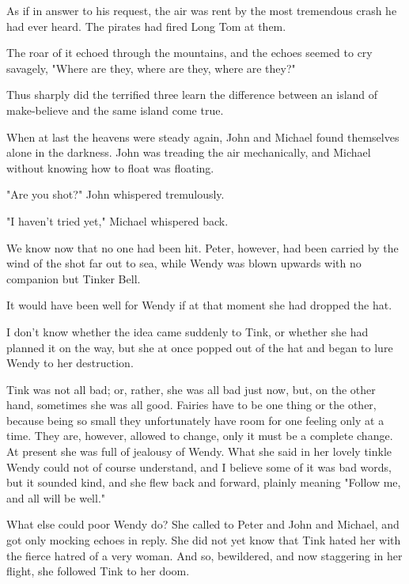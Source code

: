 As if in answer to his request, the air was rent by the most tremendous
crash he had ever heard. The pirates had fired Long Tom at them.


The roar of it echoed through the mountains, and the echoes seemed to cry
savagely, "Where are they, where are they, where are they?"


Thus sharply did the terrified three learn the difference between an
island of make-believe and the same island come true.


When at last the heavens were steady again, John and Michael found
themselves alone in the darkness. John was treading the air mechanically,
and Michael without knowing how to float was floating.


"Are you shot?" John whispered tremulously.


"I haven't tried yet," Michael whispered back.


We know now that no one had been hit. Peter, however, had been carried by
the wind of the shot far out to sea, while Wendy was blown upwards with no
companion but Tinker Bell.


It would have been well for Wendy if at that moment she had dropped the
hat.


I don't know whether the idea came suddenly to Tink, or whether she had
planned it on the way, but she at once popped out of the hat and began to
lure Wendy to her destruction.


Tink was not all bad; or, rather, she was all bad just now, but, on the
other hand, sometimes she was all good. Fairies have to be one thing or
the other, because being so small they unfortunately have room for one
feeling only at a time. They are, however, allowed to change, only it must
be a complete change. At present she was full of jealousy of Wendy. What
she said in her lovely tinkle Wendy could not of course understand, and I
believe some of it was bad words, but it sounded kind, and she flew back
and forward, plainly meaning "Follow me, and all will be well."


What else could poor Wendy do? She called to Peter and John and Michael,
and got only mocking echoes in reply. She did not yet know that Tink hated
her with the fierce hatred of a very woman. And so, bewildered, and now
staggering in her flight, she followed Tink to her doom.

